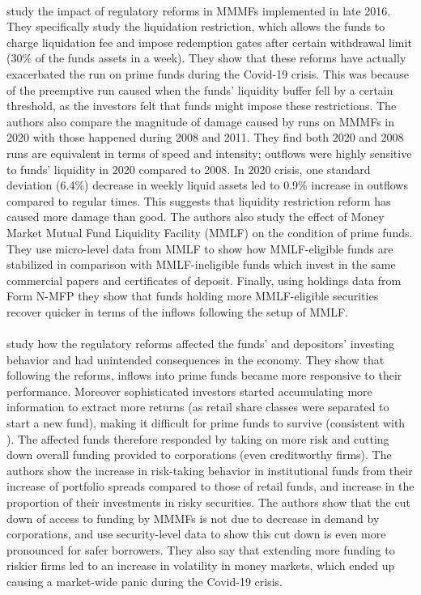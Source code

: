 \documentclass[11pt]{article}
\begin{document}
\paragraph{} \cite{li2020runs} study the impact of regulatory reforms in MMMFs implemented in late 2016. They specifically study the liquidation restriction, which allows the funds to charge liquidation fee and impose redemption gates after certain withdrawal limit (30\% of the funds assets in a week). They show that these reforms have actually exacerbated the run on prime funds during the Covid-19 crisis. This was because of the preemptive run caused when the funds' liquidity buffer fell by a certain threshold, as the investors felt that funds might impose these restrictions. The authors also compare the magnitude of damage caused by runs on MMMFs in 2020 with those happened during 2008 and 2011. They find both 2020 and 2008 runs are equivalent in terms of speed and intensity; outflows were highly sensitive to funds' liquidity in 2020 compared to 2008. In 2020 crisis, one standard deviation (6.4\%) decrease in weekly liquid assets led to 0.9\% increase in outflows compared to regular times. This suggests that liquidity restriction reform has caused more damage than good. The authors also study the effect of Money Market Mutual Fund Liquidity Facility (MMLF) on the condition of prime funds. They use micro-level data from MMLF to show how MMLF-eligible funds are stabilized in comparison with MMLF-ineligible funds which invest in the same commercial papers and certificates of deposit. Finally, using holdings data from Form N-MFP they show that funds holding more MMLF-eligible securities recover quicker in terms of the inflows following the setup of MMLF.

\paragraph{} \cite{baghai2020liability} study how the regulatory reforms affected the funds' and depositors' investing behavior and had unintended consequences in the economy. They show that following the reforms, inflows into prime funds became more responsive to their performance. Moreover sophisticated investors started accumulating more information to extract more returns (as retail share classes were separated to start a new fund), making it difficult for prime funds to survive (consistent with \cite{gallagher2020investor}). The affected funds therefore responded by taking on more risk and cutting down overall funding provided to corporations (even creditworthy firms). The authors show the increase in risk-taking behavior in institutional funds from their increase of portfolio spreads compared to those of retail funds, and increase in the proportion of their investments in risky securities. The authors show that the cut down of access to funding by MMMFs is not due to decrease in demand by corporations, and use security-level data to show this cut down is even more pronounced for safer borrowers. They also say that extending more funding to riskier firms led to an increase in volatility in money markets, which ended up causing a market-wide panic during the Covid-19 crisis.

\clearpage

\begin{doublespacing}   %


\end{doublespacing}
\end{document}
